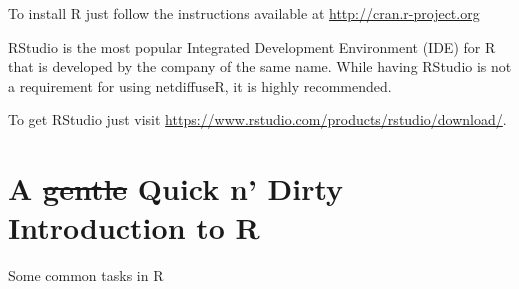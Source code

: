 \documentclass[]{book}
\begin{document}
To install R just follow the instructions available at \url{http://cran.r-project.org}

RStudio is the most popular Integrated Development Environment (IDE) for R that is developed by the company of the same name. While having RStudio is not a requirement for using netdiffuseR, it is highly recommended.

To get RStudio just visit \url{https://www.rstudio.com/products/rstudio/download/}.

\hypertarget{a-gentle-quick-n-dirty-introduction-to-r}{%
\section{\texorpdfstring{A \sout{gentle} Quick n' Dirty Introduction to R}{A gentle Quick n' Dirty Introduction to R}}\label{a-gentle-quick-n-dirty-introduction-to-r}}

Some common tasks in R
\end{document}
